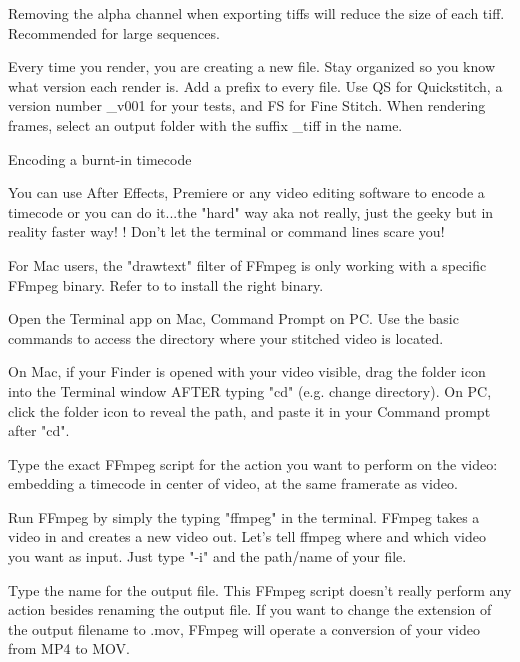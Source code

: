 \begin{fullwidth}

\tip Removing the alpha channel when exporting tiffs will reduce the size of each tiff. Recommended for large sequences.

Every time you render, you are creating a new file. Stay organized so you know what version each render is. Add a prefix to every file. Use QS for Quickstitch, a version number \_v001 for your tests, and FS for Fine Stitch. When rendering frames, select an output folder with the suffix \_tiff in the name.

\clearpage
{\large Encoding a burnt-in timecode \par}

You can use After Effects, Premiere or any video editing software to encode a timecode or you can do it...the "hard" way aka not really, just the geeky but in reality faster way! \textbf{}! Don't let the terminal or command lines scare you!

For Mac users, the "drawtext" filter of FFmpeg is only working with a specific FFmpeg binary. Refer to \textbf{} to install the right binary.

Open the Terminal app on Mac, Command Prompt on PC. Use the basic commands to access the directory where your stitched video is located.


\tip On Mac, if your Finder is opened with your video visible, drag the folder icon into the Terminal window AFTER typing "cd" (e.g. change directory). On PC, click the folder icon to reveal the path, and paste it in your Command prompt after "cd".

Type the exact FFmpeg script for the action you want to perform on the video: embedding a timecode in center of video, at the same framerate as video.

Run FFmpeg by simply the typing "ffmpeg" in the terminal. FFmpeg takes a video in and creates a new video out. Let's tell ffmpeg where and which video you want as input. Just type "-i" and the path/name of your file.


Type the name for the output file. This FFmpeg script doesn't really perform any action besides renaming the output file. If you want to change the extension of the output filename to .mov, FFmpeg will operate a conversion of your video from MP4 to MOV.



\end{fullwidth}
